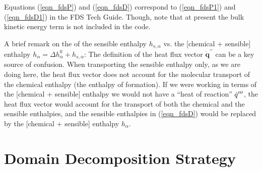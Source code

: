 \documentclass[11pt]{book}
\begin{document}
Equations (\ref{eqn_fdsP}) and (\ref{eqn_fdsD}) correspond to (\ref{eqn_fdsP1}) and (\ref{eqn_fdsD1}) in the FDS Tech Guide.  Though, note that at present the bulk kinetic energy term is not included in the code.

A brief remark on the of the sensible enthalpy $h_{s,\alpha}$ vs. the [chemical + sensible] enthalpy $h_\alpha = \Delta h_\alpha^0 + h_{s,\alpha}$:
The definition of the heat flux vector $\dot{\mathbf{q}}^{\prime\prime}$ can be a key source of confusion.
When transporting the sensible enthalpy only, as we are doing here, the heat flux vector does not account for the molecular transport of the
chemical enthalpy (the enthalpy of formation).  If we were working in terms of the [chemical + sensible] enthalpy we would not have
a ``heat of reaction'' $\dot{q}^{{\prime\prime\prime}}$, the heat flux vector would account for the transport of both the chemical and the sensible enthalpies,
and the sensible enthalpies in (\ref{eqn_fdsD}) would be replaced by the [chemical + sensible] enthalpy $h_{\alpha}$.




\chapter{Domain Decomposition Strategy}
\label{app_pressure_correction}
\end{document}
